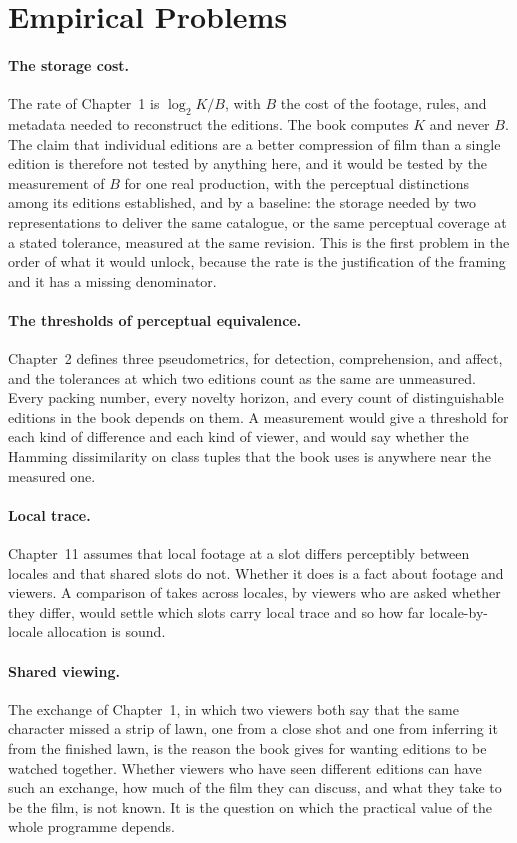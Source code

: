 \documentclass[11pt,twoside,openright]{book}
\theoremstyle{plain}
\theoremstyle{definition}
\theoremstyle{remark}
\begin{document}
\section{Empirical Problems}\label{sec:emp18}

\paragraph{The storage cost.} The rate of Chapter~1 is $\log_2K/B$, with $B$ the cost of the footage, rules, and metadata needed to reconstruct the editions. The book computes $K$ and never $B$. The claim that individual editions are a better compression of film than a single edition is therefore not tested by anything here, and it would be tested by the measurement of $B$ for one real production, with the perceptual distinctions among its editions established, and by a baseline: the storage needed by two representations to deliver the same catalogue, or the same perceptual coverage at a stated tolerance, measured at the same revision. This is the first problem in the order of what it would unlock, because the rate is the justification of the framing and it has a missing denominator.

\paragraph{The thresholds of perceptual equivalence.} Chapter~2 defines three pseudometrics, for detection, comprehension, and affect, and the tolerances at which two editions count as the same are unmeasured. Every packing number, every novelty horizon, and every count of distinguishable editions in the book depends on them. A measurement would give a threshold for each kind of difference and each kind of viewer, and would say whether the Hamming dissimilarity on class tuples that the book uses is anywhere near the measured one.

\paragraph{Local trace.} Chapter~11 assumes that local footage at a slot differs perceptibly between locales and that shared slots do not. Whether it does is a fact about footage and viewers. A comparison of takes across locales, by viewers who are asked whether they differ, would settle which slots carry local trace and so how far locale-by-locale allocation is sound.

\paragraph{Shared viewing.} The exchange of Chapter~1, in which two viewers both say that the same character missed a strip of lawn, one from a close shot and one from inferring it from the finished lawn, is the reason the book gives for wanting editions to be watched together. Whether viewers who have seen different editions can have such an exchange, how much of the film they can discuss, and what they take to be the film, is not known. It is the question on which the practical value of the whole programme depends.
\end{document}

